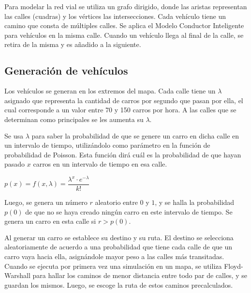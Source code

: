 \documentclass[colorinlistoftodos,twoside,twocolumn]{article} %
\begin{document}
	Para modelar la red vial se utiliza un grafo dirigido, donde las aristas representan las calles (cuadras) y los vértices las intersecciones. Cada vehículo tiene un camino que consta de múltiples calles. Se aplica el Modelo Conductor Inteligente para vehículos en la misma calle. Cuando un vehículo llega al final de la calle, se retira de la misma y es añadido a la siguiente.
	
	\subsection{Generación de vehículos}
	
	Los veh\'iculos se generan en los extremos del mapa. Cada calle tiene un $\lambda$ asignado que representa la cantidad de carros por segundo que pasan por ella, el cual corresponde a un valor entre 70 y 150 carros por hora. A las calles que se determinan como principales se les aumenta su $\lambda$.
	
	Se usa $\lambda$ para saber la probabilidad de que se genere un carro en dicha calle en un intervalo de tiempo, utiliz\'andolo como par\'ametro en la funci\'on de probabilidad de Poisson. Esta funci\'on dir\'a cu\'al es la probabilidad de que hayan pasado $ x $ carros en un intervalo de tiempo en esa calle.  
	
	\begin{center}
		$ p(x) = f(x, \lambda) = \dfrac{\lambda^{x} \cdot e^{-\lambda}}{k!} $		
	\end{center}

	Luego, se genera un n\'umero $ r $ aleatorio entre $ 0 $ y $ 1 $, y se halla la probabilidad $ p(0) $ de que no se haya creado ning\'un carro en este intervalo de tiempo. Se genera un carro en esta calle si $ r > p(0) $.
	
	Al generar un carro se establece su destino y su ruta. El destino se selecciona aleatoriamente de acuerdo a una probabilidad que tiene cada calle de que un carro vaya hacia ella, asign\'andole mayor peso a las calles m\'as transitadas. Cuando se ejecuta por primera vez una simulaci\'on en un mapa, se utiliza Floyd-Warshall para hallar los caminos de menor distancia entre todo par de calles, y se guardan los mismos. Luego, se escoge la ruta de estos caminos precalculados. 
	
	
\end{document}

